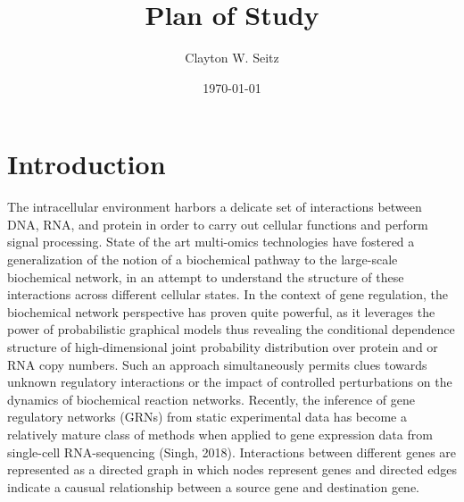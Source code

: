 \documentclass{article}
\title{Plan of Study}
\author{Clayton W. Seitz}
\date{\today}
\begin{document}
  \maketitle%
\vspace{0.4in}

\begin{abstract}
\end{abstract}

\section{Introduction}

The intracellular environment harbors a delicate set of interactions between DNA, RNA, and protein in order to carry out cellular functions and perform signal processing. State of the art multi-omics technologies have fostered a generalization of the notion of a biochemical pathway to the large-scale biochemical network, in an attempt to understand the structure of these interactions across different cellular states. In the context of gene regulation, the biochemical network perspective has proven quite powerful, as it leverages the power of probabilistic graphical models thus revealing the conditional dependence structure of high-dimensional joint probability distribution over protein and or RNA copy numbers. Such an approach simultaneously permits clues towards unknown regulatory interactions or the impact of controlled perturbations on the dynamics of biochemical reaction networks. Recently, the inference of gene regulatory networks (GRNs) from static experimental data has become a relatively mature class of methods when applied to gene expression data from single-cell RNA-sequencing (Singh, 2018). Interactions between different genes are represented as a directed graph in which nodes represent genes and directed edges indicate a causual relationship between a source gene and destination gene. 
\end{document}

